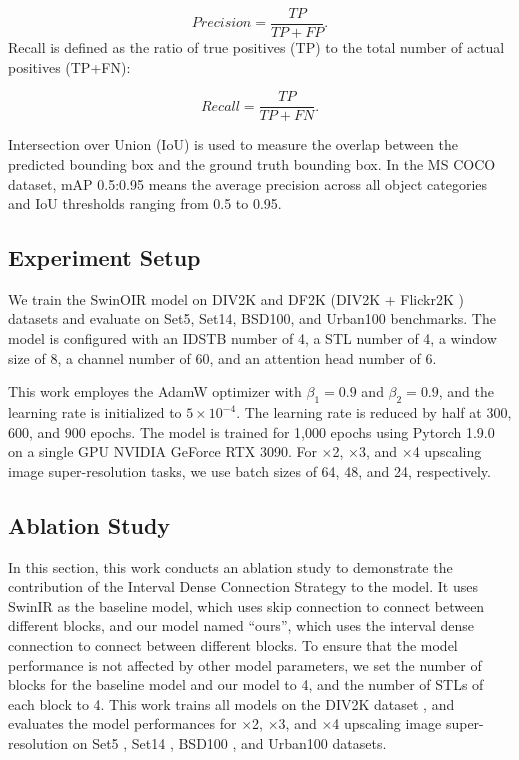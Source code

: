 \documentclass[default,iicol]{sn-jnl}
\theoremstyle{thmstyleone}\newtheorem{theorem}{Theorem}\newtheorem{proposition}[theorem]{Proposition}
\theoremstyle{thmstyletwo}\newtheorem{example}{Example}\newtheorem{remark}{Remark}\theoremstyle{thmstylethree}\newtheorem{definition}{Definition}
\begin{document}
\begin{equation}
Precision = \frac{TP}{TP + FP}.
\end{equation}
Recall is defined as the ratio of true positives (TP) to the total number of actual positives (TP+FN):

\begin{equation}
Recall = \frac{TP}{TP + FN}.
\end{equation}

Intersection over Union (IoU) is used to measure the overlap between the predicted bounding box and the ground truth bounding box. In the MS COCO dataset, mAP 0.5:0.95 means the average precision across all object categories and IoU thresholds ranging from 0.5 to 0.95.

\subsection{Experiment Setup}
\label{setup}
We train the SwinOIR model on DIV2K \cite{Ignatov2018} and DF2K (DIV2K + Flickr2K \cite{timofte2017ntire}) datasets and evaluate on Set5, Set14, BSD100, and Urban100 benchmarks. The model is configured with an IDSTB number of 4, a STL number of 4, a window size of 8, a channel number of 60, and an attention head number of 6.

This work employes the AdamW optimizer \cite{loshchilov2018decoupled} with $\beta_1 = 0.9$ and $\beta_2 = 0.9$, and the learning rate is initialized to $5 \times 10^{-4}$. The learning rate is reduced by half at 300, 600, and 900 epochs. The model is trained for 1,000 epochs using Pytorch 1.9.0 on a single GPU NVIDIA GeForce RTX 3090. For $\times$2, $\times$3, and $\times$4 upscaling image super-resolution tasks, we use batch sizes of 64, 48, and 24, respectively.

\subsection{Ablation Study}
\label{ablation}
In this section, this work conducts an ablation study to demonstrate the contribution of the Interval Dense Connection Strategy to the model. It uses SwinIR \cite{liang2021swinir} as the baseline model, which uses skip connection to connect between different blocks, and our model named ``ours'', which uses the interval dense connection to connect between different blocks. To ensure that the model performance is not affected by other model parameters, we set the number of blocks for the baseline model and our model to 4, and the number of STLs of each block to 4. This work trains all models on the DIV2K dataset \cite{Ignatov2018}, and evaluates the model performances for $\times$2, $\times$3, and $\times$4 upscaling image super-resolution on Set5 \cite{bevilacqua2012low}, Set14 \cite{zeyde2012single}, BSD100 \cite{martin2001database}, and Urban100 \cite{huang2015single} datasets.
\end{document}
